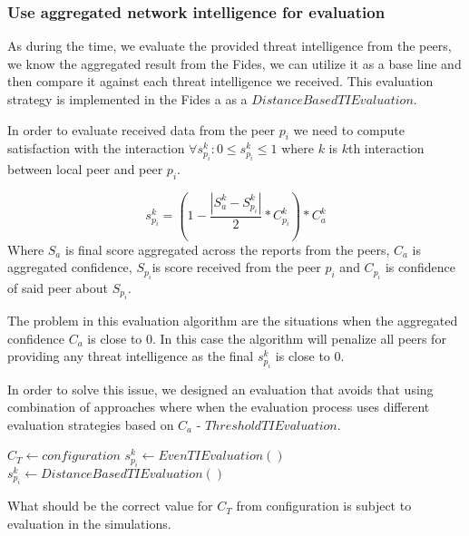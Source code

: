 \subsubsection{Use aggregated network intelligence for evaluation}
As during the time, we evaluate the provided threat intelligence from the peers, we know the aggregated result from the Fides, we can utilize it as a base line and then compare it against each threat intelligence we received. This evaluation strategy is implemented in the Fides a as a $DistanceBasedTIEvaluation$.


In order to evaluate received data from the peer $p_i$ we need to compute satisfaction with the interaction  $\forall s^{k}_{p_i}: 0 \leq s^{k}_{p_i} \leq 1$ where $k$ is $k$th interaction  between local peer and peer $p_i$.

\begin{equation}
s^{k}_{p_i} = (1 - \frac{|S^{k}_{a} - S^{k}_{p_i}|}{2} * C^{k}_{p_i}) * C^{k}_a
\end{equation}
Where $S_a$ is final score aggregated across the reports from the peers, $C_a$ is aggregated confidence, $S_{p_i}$is score received from the peer $p_i$ and $C_{p_i}$ is confidence of said peer about $S_{p_i}$. 

The problem in this evaluation algorithm are the situations when the aggregated confidence $C_a$ is close to $0$. In this case the algorithm will penalize all peers for providing any threat intelligence as the final $s^{k}_{p_i}$ is close to $0$.



In order to solve this issue, we designed an evaluation that avoids that using combination of approaches where when the evaluation process uses different evaluation strategies based on $C_a$ - $ThresholdTIEvaluation$. 
\begin{algorithm}
\caption{$ThresholdTIEvaluation$}\label{alg:threshold-ti-evaluation}
\begin{algorithmic}[1]
\State $C_T \gets configuration$ 
	\State $s^{k}_{p_i} \gets EvenTIEvaluation()$
\Else
    \State $s^{k}_{p_i} \gets DistanceBasedTIEvaluation()$
\EndIf
\end{algorithmic}
\end{algorithm}

What should be the correct value for $C_T$ from configuration is subject to evaluation in the simulations.


